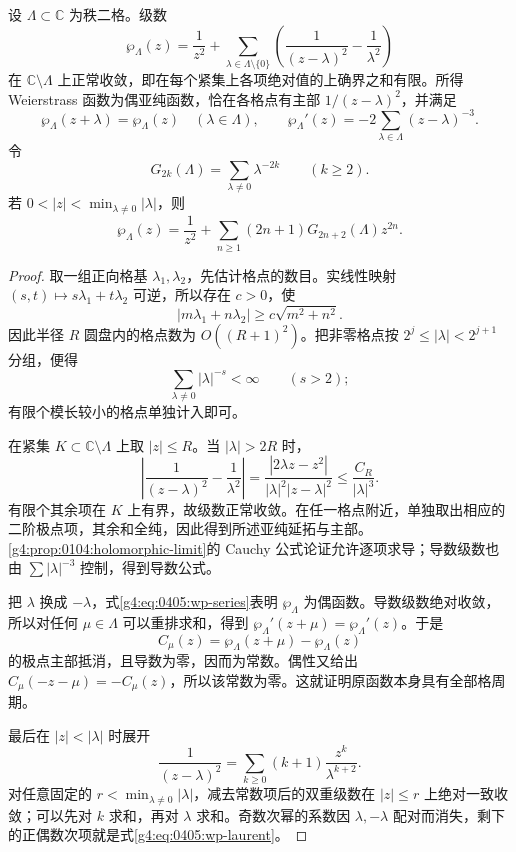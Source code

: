 \begin{theorem}\label{g4:thm:0405:weierstrass-series}
	设 \(\Lambda\subset\mathbb C\) 为秩二格。级数
	\begin{equation}\label{g4:eq:0405:wp-series}
		\wp_\Lambda(z)=\frac1{z^2}
		+\sum_{\lambda\in\Lambda\setminus\{0\}}
		\left(\frac1{(z-\lambda)^2}-\frac1{\lambda^2}\right)
	\end{equation}
	在 \(\mathbb C\setminus\Lambda\) 上正常收敛，即在每个紧集上各项绝对值的上确界之和有限。所得 Weierstrass 函数为偶亚纯函数，恰在各格点有主部 \(1/(z-\lambda)^2\)，并满足
	\[
		\wp_\Lambda(z+\lambda)=\wp_\Lambda(z)\quad(\lambda\in\Lambda),
		\qquad
		\wp_\Lambda'(z)=-2\sum_{\lambda\in\Lambda}(z-\lambda)^{-3}.
	\]
	令
	\[
		G_{2k}(\Lambda)=\sum_{\lambda\ne0}\lambda^{-2k}\qquad(k\ge2).
	\]
	若 \(0<|z|<\min_{\lambda\ne0}|\lambda|\)，则
	\begin{equation}\label{g4:eq:0405:wp-laurent}
		\wp_\Lambda(z)
		=\frac1{z^2}+\sum_{n\ge1}(2n+1)G_{2n+2}(\Lambda)z^{2n}.
	\end{equation}
\end{theorem}
\begin{proof}
	取一组正向格基 \(\lambda_1,\lambda_2\)，先估计格点的数目。实线性映射
	\((s,t)\mapsto s\lambda_1+t\lambda_2\) 可逆，所以存在 \(c>0\)，使
	\[
		|m\lambda_1+n\lambda_2|\ge c\sqrt{m^2+n^2}.
	\]
	因此半径 \(R\) 圆盘内的格点数为 \(O((R+1)^2)\)。把非零格点按 \(2^j\le|\lambda|<2^{j+1}\) 分组，便得
	\[
		\sum_{\lambda\ne0}|\lambda|^{-s}<\infty\qquad(s>2);
	\]
	有限个模长较小的格点单独计入即可。

	在紧集 \(K\subset\mathbb C\setminus\Lambda\) 上取 \(|z|\le R\)。当 \(|\lambda|>2R\) 时，
	\[
		\left|\frac1{(z-\lambda)^2}-\frac1{\lambda^2}\right|
		=\frac{|2\lambda z-z^2|}{|\lambda|^2|z-\lambda|^2}
		\le \frac{C_R}{|\lambda|^3}.
	\]
	有限个其余项在 \(K\) 上有界，故级数正常收敛。在任一格点附近，单独取出相应的二阶极点项，其余和全纯，因此得到所述亚纯延拓与主部。\cref{g4:prop:0104:holomorphic-limit}的 Cauchy 公式论证允许逐项求导；导数级数也由 \(\sum|\lambda|^{-3}\) 控制，得到导数公式。

	把 \(\lambda\) 换成 \(-\lambda\)，式\eqref{g4:eq:0405:wp-series}表明 \(\wp_\Lambda\) 为偶函数。导数级数绝对收敛，所以对任何 \(\mu\in\Lambda\) 可以重排求和，得到
	\(\wp_\Lambda'(z+\mu)=\wp_\Lambda'(z)\)。于是
	\[
		C_\mu(z)=\wp_\Lambda(z+\mu)-\wp_\Lambda(z)
	\]
	的极点主部抵消，且导数为零，因而为常数。偶性又给出
	\(C_\mu(-z-\mu)=-C_\mu(z)\)，所以该常数为零。这就证明原函数本身具有全部格周期。

	最后在 \(|z|<|\lambda|\) 时展开
	\[
		\frac1{(z-\lambda)^2}
		=\sum_{k\ge0}(k+1)\frac{z^k}{\lambda^{k+2}}.
	\]
	对任意固定的 \(r<\min_{\lambda\ne0}|\lambda|\)，减去常数项后的双重级数在 \(|z|\le r\) 上绝对一致收敛；可以先对 \(k\) 求和，再对 \(\lambda\) 求和。奇数次幂的系数因 \(\lambda,-\lambda\) 配对而消失，剩下的正偶数次项就是式\eqref{g4:eq:0405:wp-laurent}。
\end{proof}

